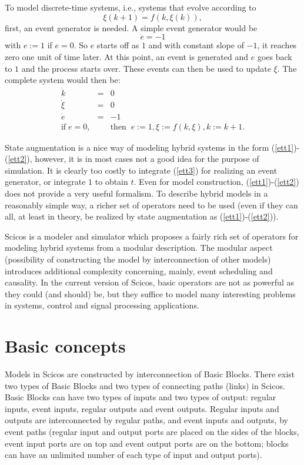 To model discrete-time systems, i.e., systems that evolve according to
\begin{equation}
\xi(k+1)=f(k,\xi(k)),
\end{equation}
first, an event generator is needed. A simple event generator would be
\begin{equation}
\dot{e}=-1  \label{ett3}
\end{equation}
with $e:=1$ if $e=0$. So $e$ starts off as $1$ and with constant slope
of $-1$, it reaches zero one unit of time later. At this point, an
event is generated and $e$ goes back to $1$ and the process starts
over. These events can then be used to update $\xi$. The complete
system would then be:
\begin{eqnarray}
\dot{k}&=&0 \\
\dot{\xi}&=&0 \\
\dot{e}&=&-1 \\
\mbox{if}\;e=0,&&\mbox{then}\;\;e:=1,\xi:=f(k,\xi),k:=k+1.
\end{eqnarray}

State augmentation is a nice way of modeling hybrid systems in the form 
(\ref{ett1})-(\ref{ett2}), however, it is in most cases not a good idea for
the purpose of simulation. It is clearly too costly to integrate
(\ref{ett3}) for realizing an event generator, or integrate $1$ to
obtain $t$. Even for model construction, (\ref{ett1})-(\ref{ett2})
does not provide a very useful formalism. To describe hybrid models in
a reasonably simple way, a richer set of operators need to be used
(even if they can all, at least in theory, be realized by state
augmentation as (\ref{ett1})-(\ref{ett2})).

Scicos  is a modeler and simulator which proposes a fairly rich set of
operators for modeling hybrid systems from a modular description. The
modular aspect (possibility of constructing the model by
interconnection of other models) introduces additional complexity
concerning, mainly, event scheduling and causality. In the current
version of Scicos, basic operators are not as powerful as they could
(and should) be, but they suffice to model many interesting problems
in systems, control and signal processing applications. 


\setcounter{equation}{0}
\section{Basic concepts}
\label{ssa}
Models in Scicos   are constructed by interconnection of Basic
Blocks. There exist two types of Basic Blocks and two types of
connecting paths (links) in Scicos. Basic Blocks can have two types of inputs
and two types of output: regular inputs, event inputs, regular outputs
and event outputs. Regular inputs and outputs are interconnected by
regular paths, and event inputs and outputs, by event paths (regular
input and output ports are placed on the sides of the blocks, event
input ports are on top and event output ports are on the bottom;
blocks can have an unlimited number of each type of input and output
ports).  

